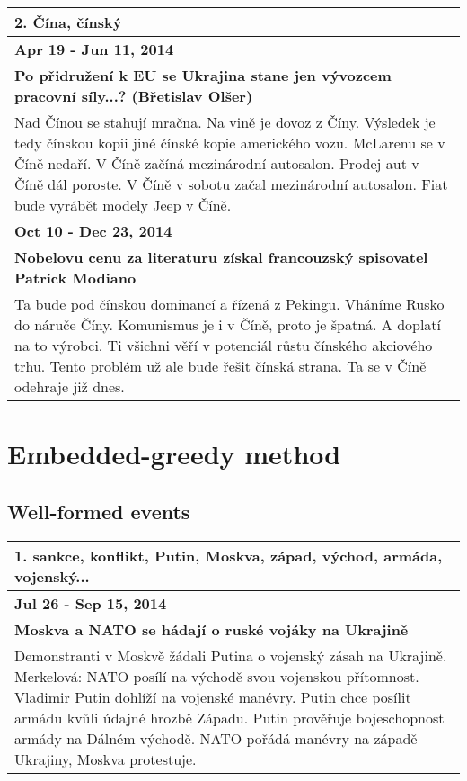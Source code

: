 \par

\begin{tabularx}{\linewidth}{p{\linewidth}} \toprule[1.5pt]
\bf 2. Čína, čínský \\ \midrule
\bf Apr 19 - Jun 11, 2014 \\ \midrule
\bf Po přidružení k EU se Ukrajina stane jen vývozcem pracovní síly...? (Břetislav Olšer) \\
Nad Čínou se stahují mračna. Na vině je dovoz z Číny. Výsledek je tedy čínskou kopii jiné čínské kopie amerického vozu. McLarenu se v Číně nedaří. V Číně začíná mezinárodní autosalon. Prodej aut v Číně dál poroste. V Číně v sobotu začal mezinárodní autosalon. Fiat bude vyrábět modely Jeep v Číně. \\ \bottomrule[1.25pt]

\bf Oct 10 - Dec 23, 2014 \\ \midrule
\bf Nobelovu cenu za literaturu získal francouzský spisovatel Patrick Modiano \\
Ta bude pod čínskou dominancí a řízená z Pekingu. Vháníme Rusko do náruče Číny. Komunismus je i v Číně, proto je špatná. A doplatí na to výrobci. Ti všichni věří v potenciál růstu čínského akciového trhu. Tento problém už ale bude řešit čínská strana. Ta se v Číně odehraje již dnes. \\ \bottomrule[1.25pt]

\end{tabularx}

\par


\section{Embedded-greedy method}
\subsection*{Well-formed events}

\par

\begin{tabularx}{\linewidth}{p{\linewidth}} \toprule[1.5pt]
\bf 1. sankce, konflikt, Putin, Moskva, západ, východ, armáda, vojenský... \\ \midrule
\bf Jul 26 - Sep 15, 2014 \\ \midrule
\bf Moskva a NATO se hádají o ruské vojáky na Ukrajině \\
Demonstranti v Moskvě žádali Putina o vojenský zásah na Ukrajině. Merkelová: NATO posílí na východě svou vojenskou přítomnost. Vladimir Putin dohlíží na vojenské manévry. Putin chce posílit armádu kvůli údajné hrozbě Západu. Putin prověřuje bojeschopnost armády na Dálném východě. NATO pořádá manévry na západě Ukrajiny, Moskva protestuje. \\ \bottomrule[1.25pt]

\end{tabularx}

